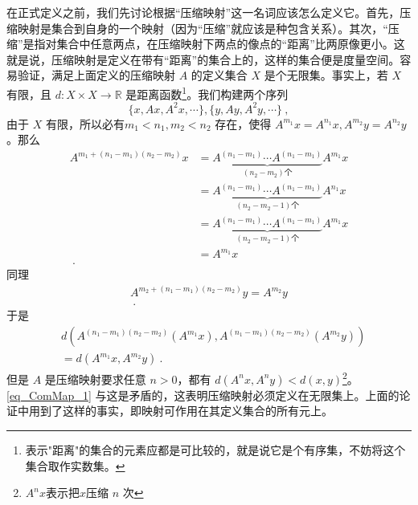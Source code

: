 在正式定义之前，我们先讨论根据“压缩映射”这一名词应该怎么定义它。首先，压缩映射是集合到自身的一个映射（因为“压缩”就应该是种包含关系）。其次，“压缩”是指对集合中任意两点，在压缩映射下两点的像点的“距离”比两原像更小。这就是说，压缩映射是定义在带有“距离”的集合上的，这样的集合便是度量空间。容易验证，满足上面定义的压缩映射 $A$ 的定义集合 $X$ 是个无限集。事实上，若 $X$ 有限，且 $d:X\times X\rightarrow \mathbb R$ 是距离函数\footnote{表示"距离"的集合的元素应都是可比较的，就是说它是个有序集，不妨将这个集合取作实数集。}。我们构建两个序列
\begin{equation}
\{x,Ax,A^2x,\cdots\},\{y,Ay,A^2y,\cdots\}~,
\end{equation}
由于 $X$ 有限，所以必有$m_1<n_1,m_2<n_2$ 存在，使得 $A^{m_1}x=A^{n_1}x,A^{m_2}y=A^{n_2}y$ 。那么
\begin{equation}
\begin{aligned}
A^{m_1+(n_1-m_1)(n_2-m_2)}x&=\underbrace{A^{(n_1-m_1)}\cdots A^{(n_1-m_1)}}_{(n_2-m_2)\text{个}}A^{m_1}x\\
&=\underbrace{A^{(n_1-m_1)}\cdots A^{(n_1-m_1)}}_{(n_2-m_2-1)\text{个}}A^{n_1}x\\
&=\underbrace{A^{(n_1-m_1)}\cdots A^{(n_1-m_1)}}_{(n_2-m_2-1)\text{个}}A^{m_1}x\\
&=A^{m_1}x\\~.
\end{aligned}
\end{equation}
同理
\begin{equation}
\begin{aligned}
A^{m_2+(n_1-m_1)(n_2-m_2)}y=A^{m_2}y\\~.
\end{aligned}
\end{equation}
于是
\begin{equation}\label{eq_ComMap_1}
\begin{aligned}
&d(A^{(n_1-m_1)(n_2-m_2)}(A^{m_1}x),A^{(n_1-m_1)(n_2-m_2)}(A^{m_2}y))\\
&=d(A^{m_1}x,A^{m_2}y)~.
\end{aligned}
\end{equation}
但是 $A$ 是压缩映射要求任意 $n>0$，都有 $d(A^n x,A^n y)<d(x,y)$\footnote{$A^n x$表示把$x$压缩 $n$ 次}。\autoref{eq_ComMap_1} 与这是矛盾的，这表明压缩映射必须定义在无限集上。上面的论证中用到了这样的事实，即映射可作用在其定义集合的所有元上。


